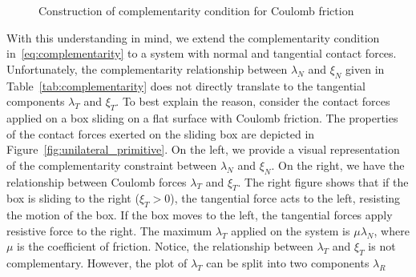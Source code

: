 \begin{figure}[tb]
  \centering
  \caption{Construction of complementarity condition for Coulomb friction}
  \label{fig:tangential_to_complementarity}
\end{figure}
%
With this understanding in mind, we extend the complementarity condition
in~\eqref{eq:complementarity} to a system with normal and tangential contact
forces.
%
Unfortunately, the complementarity relationship between $\lambda_N$ and $\xi_N$
given in Table~\ref{tab:complementarity} does not directly translate to the
tangential components $\lambda_T$ and $\xi_T$.
%
%
To best explain the reason, consider the contact forces applied on a box sliding
on a flat surface with Coulomb friction.
%
The properties of the contact forces exerted on the sliding box are depicted in
Figure~\ref{fig:unilateral_primitive}.
%
On the left, we provide a visual representation of the complementarity
constraint between $\lambda_N$ and $\xi_N$.
%
On the right, we have the relationship between Coulomb forces $\lambda_T$ and
$\xi_T$.
%
The right figure shows that if the box is sliding to the right ($\xi_T > 0$),
the tangential force acts to the left, resisting the motion of the box.
%
If the box moves to the left, the tangential forces apply resistive force to
the right.
%
The maximum $\lambda_T$ applied on the system is $\mu \lambda_N$, where $\mu$ is
the coefficient of friction.
%
Notice, the relationship between $\lambda_T$ and $\xi_T$ is not complementary.
%
However, the plot of $\lambda_T$ can be split into two components $\lambda_R$

